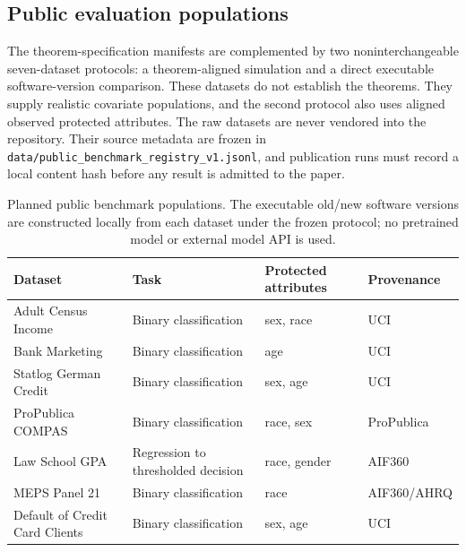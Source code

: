 \subsection{Public evaluation populations}

The theorem-specification manifests are complemented by two noninterchangeable
seven-dataset protocols: a theorem-aligned simulation and a direct executable
software-version comparison. These datasets do not establish the theorems.
They supply realistic covariate populations, and the second protocol also uses
aligned observed protected attributes. The raw datasets are never vendored
into the repository. Their source metadata are frozen in
\texttt{data/public\_benchmark\_registry\_v1.jsonl}, and publication runs must record a
local content hash before any result is admitted to the paper.

\begin{table}[H]
\centering
\caption{Planned public benchmark populations. The executable old/new software
versions are constructed locally from each dataset under the frozen protocol;
no pretrained model or external model API is used.}
\label{tab:public-datasets}
\small
\begin{tabular}{@{}p{}p{}p{}p{}@{}}
\toprule
Dataset & Task & Protected attributes & Provenance \\
\midrule
Adult Census Income & Binary classification & sex, race & UCI \cite{AdultDatasetUCI} \\
Bank Marketing & Binary classification & age & UCI \cite{BankMarketingUCI} \\
Statlog German Credit & Binary classification & sex, age & UCI \cite{GermanCreditUCI} \\
ProPublica COMPAS & Binary classification & race, sex & ProPublica \cite{ProPublicaCOMPAS2016} \\
Law School GPA & Regression to thresholded decision & race, gender & AIF360 \cite{BellamyEtAl2019} \\
MEPS Panel 21 & Binary classification & race & AIF360/AHRQ \cite{BellamyEtAl2019} \\
Default of Credit Card Clients & Binary classification & sex, age & UCI \cite{DefaultCreditUCI} \\
\bottomrule
\end{tabular}
\end{table}

